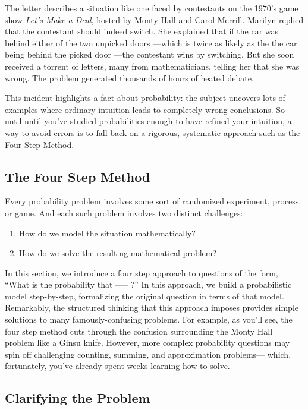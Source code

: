 The letter describes a situation like one faced by contestants on the
1970's game show \textit{Let's Make a Deal}, hosted by Monty Hall and
Carol Merrill.  Marilyn replied that the contestant should indeed switch.
She explained that if the car was behind either of the two unpicked doors
---which is twice as likely as the the car being behind the picked door
---the contestant wins by switching.  But she soon received a torrent of
letters, many from mathematicians, telling her that she was wrong.  The
problem generated thousands of hours of heated debate.

This incident highlights a fact about probability: the subject uncovers
lots of examples where ordinary intuition leads to completely wrong
conclusions.  So until until you've studied probabilities enough to have
refined your intuition, a way to avoid errors is to fall back on a
rigorous, systematic approach such as the Four Step Method.

\subsection{The Four Step Method}

Every probability problem involves some sort of randomized experiment,
process, or game.  And each such problem involves two distinct
challenges:
%
\begin{enumerate}
\item How do we model the situation mathematically?
\item How do we solve the resulting mathematical problem?
\end{enumerate}
%
In this section, we introduce a four step approach to questions of the
form, ``What is the probability that ----- ?''  In this approach, we build
a probabilistic model step-by-step, formalizing the original question in
terms of that model.  Remarkably, the structured thinking that this
approach imposes provides simple solutions to many famously-confusing
problems.  For example, as you'll see, the four step method cuts through
the confusion surrounding the Monty Hall problem like a Ginsu knife.
However, more complex probability questions may spin off challenging
counting, summing, and approximation problems--- which, fortunately,
you've already spent weeks learning how to solve.

\subsection{Clarifying the Problem}

